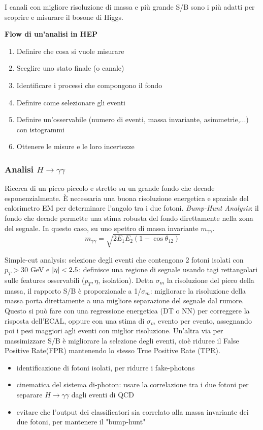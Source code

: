 \documentclass{article}
\begin{document}
I canali con migliore risoluzione di massa e più grande S/B sono i più adatti per scoprire e misurare il bosone di Higgs.\newline

\textbf{Flow di un'analisi in HEP}
\begin{enumerate}
    \item Definire che cosa si vuole misurare
    \item Sceglire uno stato finale (o canale)
    \item Identificare i processi che compongono il fondo
    \item Definire come selezionare gli eventi
    \item Definire un'osservabile (numero di eventi, massa invariante, asimmetrie,...) con istogrammi
    \item Ottenere le misure e le loro incertezze
\end{enumerate}

\subsubsection*{Analisi $H\rightarrow\gamma\gamma$}
Ricerca di un picco piccolo e stretto su un grande fondo che decade esponenzialmente.
È necessaria una buona risoluzione energetica e spaziale del calorimetro EM per determinare l'angolo tra i due fotoni.\newline
\textit{Bump-Hunt Analysis}: il fondo che decade permette una stima robusta del fondo direttamente nella zona del segnale. In questo caso, su uno spettro di massa invariante $m_{\gamma\gamma}$.
\[
m_{\gamma\gamma}=\sqrt{2E_1E_2(1-\cos\theta_{12})}
\]

Simple-cut analysis: selezione degli eventi che contengono 2 fotoni isolati con $p_T>30$ GeV e $\abs{\eta}<2.5$: definisce una regione di segnale usando tagi rettangolari sulle features osservabili ($p_T, \eta$, isolation).\newline
Detta $\sigma_m$ la risoluzione del picco della massa, il rapporto S/B è proporzionale a 1/$\sigma_m$: migliorare la risoluzione della massa
porta direttamente a una migliore separazione del segnale dal rumore. 
Questo si può fare con una regressione energetica (DT o NN) per correggere la risposta dell'ECAL, oppure con una stima di $\sigma_m$ evento per evento, assegnando poi i pesi maggiori agli eventi con miglior risoluzione.\newline
Un'altra via per massimizzare S/B è migliorare la selezione degli eventi, cioè riduree il False Positive Rate(FPR) mantenendo lo stesso True Positive Rate (TPR).
\begin{itemize}
    \item identificazione di fotoni isolati, per ridurre i fake-photons
    \item cinematica del sistema di-photon: usare la correlazione tra i due fotoni per separare $H\rightarrow\gamma\gamma$ dagli eventi di QCD
    \item evitare che l'output dei classificatori sia correlato alla massa invariante dei due fotoni, per mantenere il "bump-hunt"
\end{itemize}
\end{document}
